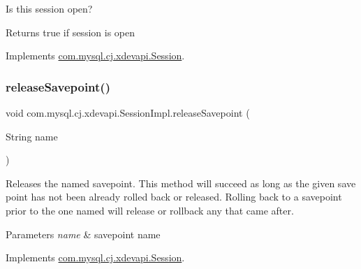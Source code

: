 Is this session open?

\begin{DoxyReturn}{Returns}
true if session is open 
\end{DoxyReturn}


Implements \mbox{\hyperlink{interfacecom_1_1mysql_1_1cj_1_1xdevapi_1_1_session_a8054b47c7bdc370ab26b41ec9ba527a6}{com.\+mysql.\+cj.\+xdevapi.\+Session}}.

\mbox{\label{classcom_1_1mysql_1_1cj_1_1xdevapi_1_1_session_impl_a8bf42a1928a6bb71f3047e072b9210b4}} 
\subsubsection{\texorpdfstring{release\+Savepoint()}{releaseSavepoint()}}
{\footnotesize\ttfamily void com.\+mysql.\+cj.\+xdevapi.\+Session\+Impl.\+release\+Savepoint (\begin{DoxyParamCaption}\item[{String}]{name }\end{DoxyParamCaption})}

Releases the named savepoint. This method will succeed as long as the given save point has not been already rolled back or released. Rolling back to a savepoint prior to the one named will release or rollback any that came after.


\begin{DoxyParams}{Parameters}
{\em name} & savepoint name \\
\hline
\end{DoxyParams}


Implements \mbox{\hyperlink{interfacecom_1_1mysql_1_1cj_1_1xdevapi_1_1_session_ad372434e6431ce9a396a29d03f3ad8c4}{com.\+mysql.\+cj.\+xdevapi.\+Session}}.

\mbox{\label{classcom_1_1mysql_1_1cj_1_1xdevapi_1_1_session_impl_a7c11c5d1f54f7a1f6ad2c0891dd59a67}} 
